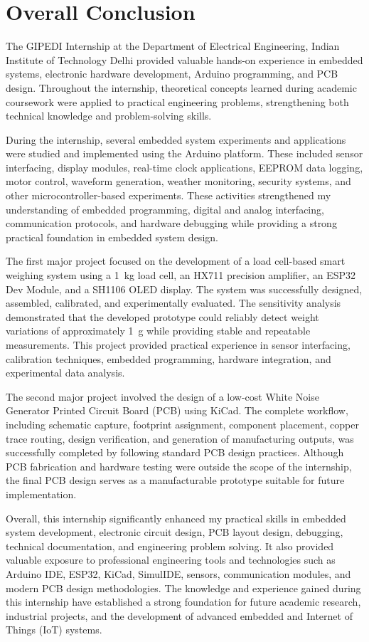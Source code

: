 \chapter{Overall Conclusion}

The GIPEDI Internship at the Department of Electrical Engineering, Indian Institute of Technology Delhi provided valuable hands-on experience in embedded systems, electronic hardware development, Arduino programming, and PCB design. Throughout the internship, theoretical concepts learned during academic coursework were applied to practical engineering problems, strengthening both technical knowledge and problem-solving skills.

During the internship, several embedded system experiments and applications were studied and implemented using the Arduino platform. These included sensor interfacing, display modules, real-time clock applications, EEPROM data logging, motor control, waveform generation, weather monitoring, security systems, and other microcontroller-based experiments. These activities strengthened my understanding of embedded programming, digital and analog interfacing, communication protocols, and hardware debugging while providing a strong practical foundation in embedded system design.

The first major project focused on the development of a load cell-based smart weighing system using a 1~kg load cell, an HX711 precision amplifier, an ESP32 Dev Module, and a SH1106 OLED display. The system was successfully designed, assembled, calibrated, and experimentally evaluated. The sensitivity analysis demonstrated that the developed prototype could reliably detect weight variations of approximately 1~g while providing stable and repeatable measurements. This project provided practical experience in sensor interfacing, calibration techniques, embedded programming, hardware integration, and experimental data analysis.

The second major project involved the design of a low-cost White Noise Generator Printed Circuit Board (PCB) using KiCad. The complete workflow, including schematic capture, footprint assignment, component placement, copper trace routing, design verification, and generation of manufacturing outputs, was successfully completed by following standard PCB design practices. Although PCB fabrication and hardware testing were outside the scope of the internship, the final PCB design serves as a manufacturable prototype suitable for future implementation.

Overall, this internship significantly enhanced my practical skills in embedded system development, electronic circuit design, PCB layout design, debugging, technical documentation, and engineering problem solving. It also provided valuable exposure to professional engineering tools and technologies such as Arduino IDE, ESP32, KiCad, SimulIDE, sensors, communication modules, and modern PCB design methodologies. The knowledge and experience gained during this internship have established a strong foundation for future academic research, industrial projects, and the development of advanced embedded and Internet of Things (IoT) systems.